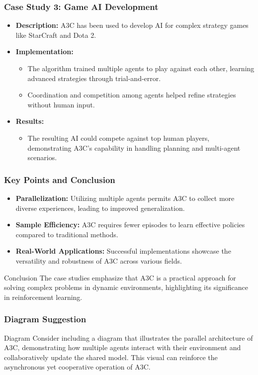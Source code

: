 \documentclass{beamer}
\begin{document}
\begin{frame}[fragile]
    \frametitle{Case Study 3: Game AI Development}
    \begin{itemize}
        \item \textbf{Description:} A3C has been used to develop AI for complex strategy games like StarCraft and Dota 2.
        \item \textbf{Implementation:}
        \begin{itemize}
            \item The algorithm trained multiple agents to play against each other, learning advanced strategies through trial-and-error.
            \item Coordination and competition among agents helped refine strategies without human input.
        \end{itemize}
        \item \textbf{Results:}
        \begin{itemize}
            \item The resulting AI could compete against top human players, demonstrating A3C's capability in handling planning and multi-agent scenarios.
        \end{itemize}
    \end{itemize}
\end{frame}

\begin{frame}[fragile]
    \frametitle{Key Points and Conclusion}
    \begin{itemize}
        \item \textbf{Parallelization:} Utilizing multiple agents permits A3C to collect more diverse experiences, leading to improved generalization.
        \item \textbf{Sample Efficiency:} A3C requires fewer episodes to learn effective policies compared to traditional methods.
        \item \textbf{Real-World Applications:} Successful implementations showcase the versatility and robustness of A3C across various fields.
    \end{itemize}
    \begin{block}{Conclusion}
        The case studies emphasize that A3C is a practical approach for solving complex problems in dynamic environments, highlighting its significance in reinforcement learning.
    \end{block}
\end{frame}

\begin{frame}[fragile]
    \frametitle{Diagram Suggestion}
    \begin{block}{Diagram}
        Consider including a diagram that illustrates the parallel architecture of A3C, demonstrating how multiple agents interact with their environment and collaboratively update the shared model. This visual can reinforce the asynchronous yet cooperative operation of A3C.
    \end{block}
\end{frame}
\end{document}
